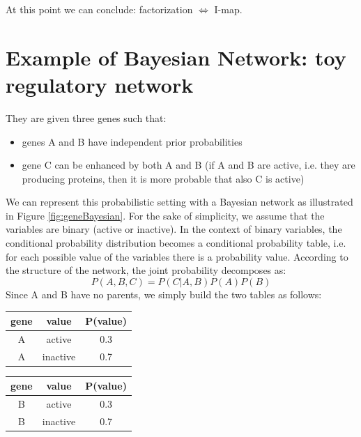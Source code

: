 At this point we can conclude: factorization $\Leftrightarrow$ I-map.


\section{Example of Bayesian Network: toy regulatory network}
They are given three genes such that:
\begin{itemize}
	\item genes A and B have independent prior probabilities

	\item gene C can be enhanced by both A and B (if A and B are active, i.e. they
		are producing proteins, then it is more probable that also C is active)
\end{itemize}
We can represent this probabilistic setting with a Bayesian network as illustrated
in Figure \ref{fig:geneBayesian}. For the sake of simplicity, we assume that the
variables are binary (active or inactive). In the context of binary variables, the
conditional probability distribution becomes a conditional probability table, i.e.
for each possible value of the variables there is a probability value. According
to the structure of the network, the joint probability decomposes as:
\[
	P(A,B,C) = P(C | A,B) P(A) P(B)
\]
Since A and B have no parents, we simply build the two tables as follows:
\begin{center}
	\begin{tabular}{c|c|c}
		\hline
		gene & value    & P(value) \\
		\hline
		A    & active   & 0.3      \\
		A    & inactive & 0.7
	\end{tabular}
\end{center}

\begin{center}
	\begin{tabular}{c|c|c}
		\hline
		gene & value    & P(value) \\
		\hline
		B    & active   & 0.3      \\
		B    & inactive & 0.7
	\end{tabular}
\end{center}


